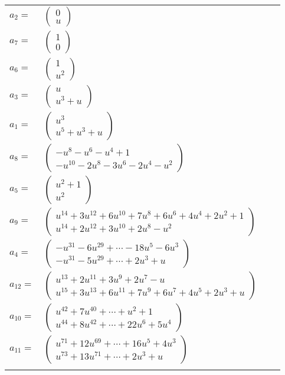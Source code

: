 \documentclass[1p]{elsarticle_modified}
\theoremstyle{definition}
\begin{document}
\begin{tabular}{m{7pt} m{180pt} m{7pt} m{180pt} }
\flushright $a_{2}=$&$\begin{pmatrix}0\\u\end{pmatrix}$ \\
\flushright $a_{7}=$&$\begin{pmatrix}1\\0\end{pmatrix}$ \\
\flushright $a_{6}=$&$\begin{pmatrix}1\\u^2\end{pmatrix}$ \\
\flushright $a_{3}=$&$\begin{pmatrix}u\\u^3+u\end{pmatrix}$ \\
\flushright $a_{1}=$&$\begin{pmatrix}u^3\\u^5+u^3+u\end{pmatrix}$ \\
\flushright $a_{8}=$&$\begin{pmatrix}- u^8- u^6- u^4+1\\- u^{10}-2 u^8-3 u^6-2 u^4- u^2\end{pmatrix}$ \\
\flushright $a_{5}=$&$\begin{pmatrix}u^2+1\\u^2\end{pmatrix}$ \\
\flushright $a_{9}=$&$\begin{pmatrix}u^{14}+3 u^{12}+6 u^{10}+7 u^8+6 u^6+4 u^4+2 u^2+1\\u^{14}+2 u^{12}+3 u^{10}+2 u^8- u^2\end{pmatrix}$ \\
\flushright $a_{4}=$&$\begin{pmatrix}- u^{31}-6 u^{29}+\cdots-18 u^5-6 u^3\\- u^{31}-5 u^{29}+\cdots+2 u^3+u\end{pmatrix}$ \\
\flushright $a_{12}=$&$\begin{pmatrix}u^{13}+2 u^{11}+3 u^9+2 u^7- u\\u^{15}+3 u^{13}+6 u^{11}+7 u^9+6 u^7+4 u^5+2 u^3+u\end{pmatrix}$ \\
\flushright $a_{10}=$&$\begin{pmatrix}u^{42}+7 u^{40}+\cdots+u^2+1\\u^{44}+8 u^{42}+\cdots+22 u^6+5 u^4\end{pmatrix}$ \\
\flushright $a_{11}=$&$\begin{pmatrix}u^{71}+12 u^{69}+\cdots+16 u^5+4 u^3\\u^{73}+13 u^{71}+\cdots+2 u^3+u\end{pmatrix}$\\&\end{tabular}
\end{document}
